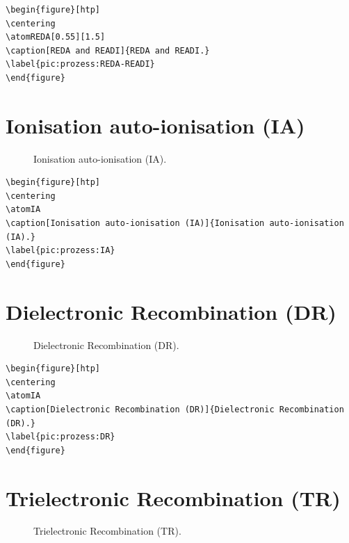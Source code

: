 \documentclass[
	a4paper,
	parskip=half,
    pagesize=auto,      		%
    listof=totoc,   		%
    bibliography=totoc,
	11pt
]{scrartcl}
\begin{document}
\begin{lstlisting}
\begin{figure}[htp]
\centering
\atomREDA[0.55][1.5]
\caption[REDA and READI]{REDA and READI.}
\label{pic:prozess:REDA-READI}
\end{figure}
\end{lstlisting}



\section{Ionisation auto-ionisation (IA)}

\begin{figure}[htp]
\centering
\atomIA
\caption[Ionisation auto-ionisation (IA)]{Ionisation auto-ionisation (IA).}
\label{pic:prozess:IA}
\end{figure}

\begin{lstlisting}
\begin{figure}[htp]
\centering
\atomIA
\caption[Ionisation auto-ionisation (IA)]{Ionisation auto-ionisation (IA).}
\label{pic:prozess:IA}
\end{figure}
\end{lstlisting}

\section{Dielectronic Recombination (DR)}

\begin{figure}[htp]
\centering
\atomDR
\caption[Dielectronic Recombination (DR)]{Dielectronic Recombination (DR).}
\label{pic:prozess:DR}
\end{figure}

\begin{lstlisting}
\begin{figure}[htp]
\centering
\atomIA
\caption[Dielectronic Recombination (DR)]{Dielectronic Recombination (DR).}
\label{pic:prozess:DR}
\end{figure}
\end{lstlisting}

\section{Trielectronic Recombination (TR)}

\begin{figure}[htp]
\centering
\atomTR
\caption[Trielectronic Recombination (TR)]{Trielectronic Recombination (TR).}
\label{pic:prozess:TR}
\end{figure}
\end{document}
